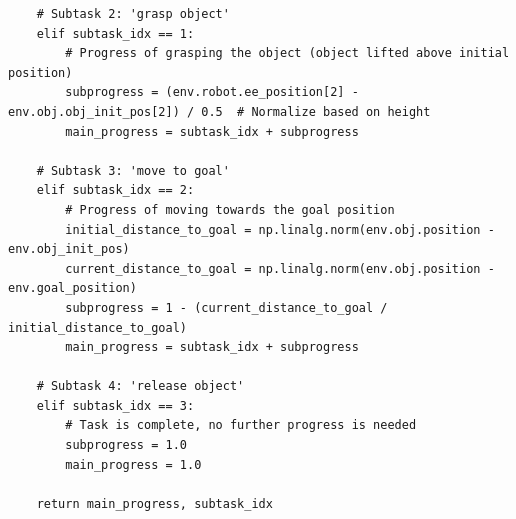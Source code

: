 \begin{tcolorbox}[colframe=kuangyellow, colback=backgroundyellow, coltitle=black, title={LLM response in Metaworld-pick-place}, breakable]
\begin{lstlisting}
    # Subtask 2: 'grasp object'
    elif subtask_idx == 1:
        # Progress of grasping the object (object lifted above initial position)
        subprogress = (env.robot.ee_position[2] - env.obj.obj_init_pos[2]) / 0.5  # Normalize based on height
        main_progress = subtask_idx + subprogress

    # Subtask 3: 'move to goal'
    elif subtask_idx == 2:
        # Progress of moving towards the goal position
        initial_distance_to_goal = np.linalg.norm(env.obj.position - env.obj_init_pos)
        current_distance_to_goal = np.linalg.norm(env.obj.position - env.goal_position)
        subprogress = 1 - (current_distance_to_goal / initial_distance_to_goal)
        main_progress = subtask_idx + subprogress

    # Subtask 4: 'release object'
    elif subtask_idx == 3:
        # Task is complete, no further progress is needed
        subprogress = 1.0
        main_progress = 1.0

    return main_progress, subtask_idx
\end{lstlisting}

\end{tcolorbox}
